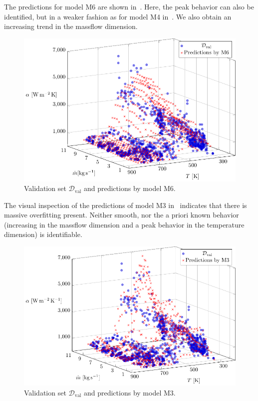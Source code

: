 The predictions for model M6 are shown in~. Here, the peak behavior can also be identified, but in a weaker fashion as for model M4 in~. We also obtain an increasing trend in the massflow dimension. 

\begin{figure}[H]
	\centering
	\includegraphics[width=\columnwidth]{graphics/pgfplots/cha5/Ebner/M6.pdf}
	\caption{Validation set $\mathcal{D}_{\text{val}}$ and predictions by model M6.}
	\label{fig:ebner-M6}
\end{figure}
%
The visual inspection of the predictions of model M3 in~ indicates that there is massive overfitting present. Neither smooth, nor the a priori known behavior (increasing in the massflow dimension and a peak behavior in the temperature dimension) is identifiable.  

\begin{figure}[H]
	\centering
	\includegraphics[width=\columnwidth]{graphics/pgfplots/cha5/Ebner/M3.pdf}
	\caption{Validation set $\mathcal{D}_{\text{val}}$ and predictions by model M3.}
	\label{fig:ebner-M3}
\end{figure}

